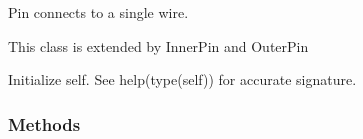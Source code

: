 \documentclass[letterpaper,10pt,english,openany,oneside]{sphinxmanual}
\begin{document}
\begin{fulllineitems}
\label{\detokenize{reference/classes/generated/spydrnet.ir.Pin:spydrnet.ir.Pin}}
Pin connects to a single wire.

This class is extended by InnerPin and OuterPin

\begin{fulllineitems}
\label{\detokenize{reference/classes/generated/spydrnet.ir.Pin:spydrnet.ir.Pin.__init__}}
Initialize self.  See help(type(self)) for accurate signature.

\end{fulllineitems}

\subsubsection*{Methods}


\begin{savenotes}\sphinxatlongtablestart\begin{longtable}[c]{}
\hline

\endfirsthead

%
{}\\
\hline

\endhead

\hline
{}\\
\endfoot

\endlastfoot


\end{longtable}
\end{savenotes}
\end{fulllineitems}
\end{document}
